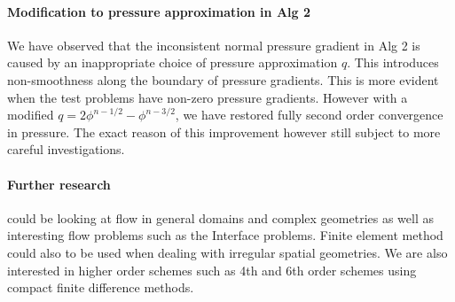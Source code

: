 \paragraph*{Modification to pressure approximation in Alg 2}
We have observed that the inconsistent normal pressure gradient in Alg 2 is caused by an inappropriate choice of pressure approximation $q$. This introduces non-smoothness along the boundary of pressure gradients. This is more evident when the test problems have non-zero pressure gradients. However with a modified $q = 2\phi^{n-1/2} - \phi^{n-3/2}$, we have restored fully second order convergence in pressure. The exact reason of this improvement however still subject to more careful investigations.

\paragraph*{Further research} could be looking at flow in general domains and complex geometries as well as interesting flow problems such as the Interface problems. Finite element method could also to be used when dealing with irregular spatial geometries. We are also interested in higher order schemes such as 4th and 6th order schemes using compact finite difference methods.